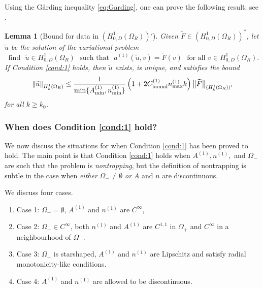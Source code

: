 \documentclass[10pt]{article}%
\newtheorem{lemma}[theorem]{Lemma}
\numberwithin{equation}{section}
\newcommand{\beq}{\begin{equation}}
\newcommand{\eeq}{\end{equation}}
\newcommand{\beqs}{\begin{equation*}}
\newcommand{\eeqs}{\end{equation*}}
\newcommand{\ben}{\begin{enumerate}}
\newcommand{\een}{\end{enumerate}}
\newcommand{\ble}{\begin{lemma}}
\newcommand{\ele}{\end{lemma}}
\newcommand{\Oi}{{\Omega_-}}
\newcommand{\Oe}{{\Omega_+}}
\newcommand{\HoDk}{{H^1_{0,D}(\domain_R)}}
\newcommand{\HoDkk}{{H^1_{k}(\domain_R)}}
\newcommand*{\N}[1]{\left\|#1\right\|}
\newcommand{\tfa}{\text{ for all }}
\newcommand{\tst}{\text{ such that }}
\newcommand{\domain}{\Omega}
\newcommand{\coeffA}{A}
\newcommand{\coeffn}{n}
\newcommand{\coeffAo}{A^{(1)}}
\newcommand{\coeffno}{n^{(1)}}
\begin{document}
Using the G\aa rding inequality \eqref{eq:Garding}, one can prove the following result; see \cite[Lemma 5.1]{GrPeSp:18}.

\ble[Bound for data in $(\HoDk)'$]\label{lem:H1}
Given $\widetilde{F}\in (H^1_{0,D}(\Omega_R))^*$, let $\widetilde{u}$ be the solution of the variational problem
\beqs
\text{ find } \,\,\widetilde{u} \in H^1_{0,D}(\domain_R) \,\,\tst \,\,
a^{(1)}(\widetilde{u},v)=\widetilde{F}(v) \,\, \tfa v\in H^1_{0,D}(\domain_R).
\eeqs
If Condition \ref{cond:1} holds, then $\widetilde{u}$ exists, is unique, and satisfies the bound
\beq\label{eq:bound2}
\N{\widetilde{u}}_{\HoDkk} \leq \frac{1}{\min\{\coeffAo_{\min},\coeffno_{\min}\}}\left( 1 + 2 C^{(1)}_{\rm bound}\coeffno_{\max}  k\right) \big\|\widetilde{F}\big\|_{(\HoDkk)'}
\eeq
for all $k\geq k_0$.
\ele


\subsubsection{When does Condition \ref{cond:1} hold?}\label{sec:cond1hold}

We now discuss the situations for when Condition \ref{cond:1} has been proved to hold. The main point is that Condition \ref{cond:1} holds when $\coeffAo, \coeffno,$ and $\Oi$ are such that the problem is \emph{nontrapping}, but the definition of nontrapping is subtle in the case when \emph{either} $\Oi \neq\emptyset$ \emph{or} $A$ and $n$ are discontinuous.

We discuss four cases.
\ben
\item[Case 1:] $\Oi=\emptyset$, $\coeffAo$ and $\coeffno$ are $C^\infty$,
\item[Case 2:] $\Oi\in C^\infty$, both $\coeffno$ and $\coeffAo$ are $C^{1,1}$ in $\Oe$ and $C^\infty$ in a neighbourhood of $\Oi$.
\item[Case 3:] $\Oi$ is starshaped, $\coeffAo$ and $\coeffno$ are Lipschitz and satisfy radial monotonicity-like conditions.
\item[Case 4:] $\coeffAo$ and $\coeffno$ are allowed to be discontinuous.
\een
\end{document}
